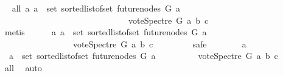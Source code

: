 \begin{isabellebody}
\ \isamarkupfalse%
\ all{}{}{\isacharcolon}{\kern0pt}\ {\isachardoublequoteopen}{\isasymforall}a{}{\isachardot}{\kern0pt}\ a{}\ {\isasymin}\ set\ {\isacharparenleft}{\kern0pt}sorted{\isacharunderscore}{\kern0pt}list{\isacharunderscore}{\kern0pt}of{\isacharunderscore}{\kern0pt}set\ {\isacharparenleft}{\kern0pt}future{\isacharunderscore}{\kern0pt}nodes\ G\ a{\isacharparenright}{\kern0pt}{\isacharparenright}{\kern0pt}\ {\isasymlongrightarrow}\isanewline
\ \ \ \ \ \ \ \ \ \ \ \ \ \ \ \ \ \ \ \ \ \ \ \ \ \ \ \ \ \ vote{\isacharunderscore}{\kern0pt}Spectre\ G\ a{}\ b\ c\ {\isasymin}\ {\isacharbraceleft}{\kern0pt}{}{\isacharcomma}{\kern0pt}{}{\isacharbraceright}{\kern0pt}{\isachardoublequoteclose}\isanewline
\ \ \ \ \ \ \isamarkupfalse%
\ {}\isanewline
\ \ \ \ \ \ \isamarkupfalse%
\ metis\isanewline
\ \ \ \ \isamarkupfalse%
\ {\isachardoublequoteopen}{\isasymforall}a{}{\isachardot}{\kern0pt}\ a{}\ {\isasymin}\ set\ {\isacharparenleft}{\kern0pt}sorted{\isacharunderscore}{\kern0pt}list{\isacharunderscore}{\kern0pt}of{\isacharunderscore}{\kern0pt}set\ {\isacharparenleft}{\kern0pt}future{\isacharunderscore}{\kern0pt}nodes\ G\ a{\isacharparenright}{\kern0pt}{\isacharparenright}{\kern0pt}\ \isanewline
\ \ \ \ \ \ \ \ \ \ \ \ \ \ \ \ {\isasymlongrightarrow}\ vote{\isacharunderscore}{\kern0pt}Spectre\ G\ a{}\ b\ c\ {\isasymge}\ {}{\isachardoublequoteclose}\ \isanewline
\ \ \ \ \isamarkupfalse%
\ safe\isanewline
\ \ \ \ \ \ \isamarkupfalse%
\ a{}\isanewline
\ \ \ \ \ \ \isamarkupfalse%
\ {\isachardoublequoteopen}\ a{}\ {\isasymin}\ set\ {\isacharparenleft}{\kern0pt}sorted{\isacharunderscore}{\kern0pt}list{\isacharunderscore}{\kern0pt}of{\isacharunderscore}{\kern0pt}set\ {\isacharparenleft}{\kern0pt}future{\isacharunderscore}{\kern0pt}nodes\ G\ a{\isacharparenright}{\kern0pt}{\isacharparenright}{\kern0pt}{\isachardoublequoteclose}\isanewline
\ \ \ \ \ \ \isamarkupfalse%
\ \isamarkupfalse%
\ {\isachardoublequoteopen}vote{\isacharunderscore}{\kern0pt}Spectre\ G\ a{}\ b\ c\ {\isasymin}\ {\isacharbraceleft}{\kern0pt}{}{\isacharcomma}{\kern0pt}\ {}{\isacharbraceright}{\kern0pt}{\isachardoublequoteclose}\ \isamarkupfalse%
\ all{}{}\ \isamarkupfalse%
\ auto\isanewline
\ \ \ \ \ \ \isamarkupfalse%

\end{isabellebody}
